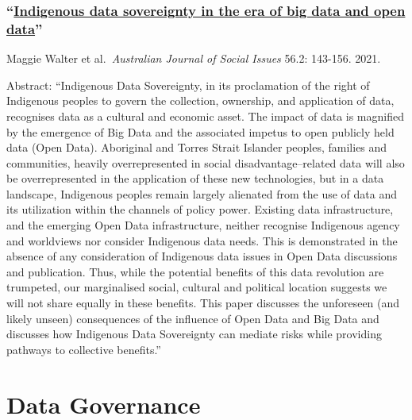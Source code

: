 \documentclass[
]{book}
\begin{document}
\hypertarget{indigenous-data-sovereignty-in-the-era-of-big-data-and-open-data}{%
\subsubsection*{\texorpdfstring{``\href{https://onlinelibrary.wiley.com/doi/full/10.1002/ajs4.141}{Indigenous data sovereignty in the era of big data and open data}''}{``Indigenous data sovereignty in the era of big data and open data''}}\label{indigenous-data-sovereignty-in-the-era-of-big-data-and-open-data}}

Maggie Walter et al.~\emph{Australian Journal of Social Issues} 56.2: 143-156. 2021.

Abstract: ``Indigenous Data Sovereignty, in its proclamation of the right of Indigenous peoples to govern the collection, ownership, and application of data, recognises data as a cultural and economic asset. The impact of data is magnified by the emergence of Big Data and the associated impetus to open publicly held data (Open Data). Aboriginal and Torres Strait Islander peoples, families and communities, heavily overrepresented in social disadvantage--related data will also be overrepresented in the application of these new technologies, but in a data landscape, Indigenous peoples remain largely alienated from the use of data and its utilization within the channels of policy power. Existing data infrastructure, and the emerging Open Data infrastructure, neither recognise Indigenous agency and worldviews nor consider Indigenous data needs. This is demonstrated in the absence of any consideration of Indigenous data issues in Open Data discussions and publication. Thus, while the potential benefits of this data revolution are trumpeted, our marginalised social, cultural and political location suggests we will not share equally in these benefits. This paper discusses the unforeseen (and likely unseen) consequences of the influence of Open Data and Big Data and discusses how Indigenous Data Sovereignty can mediate risks while providing pathways to collective benefits.''

\hypertarget{data-governance}{%
\section{Data Governance}\label{data-governance}}
\end{document}
